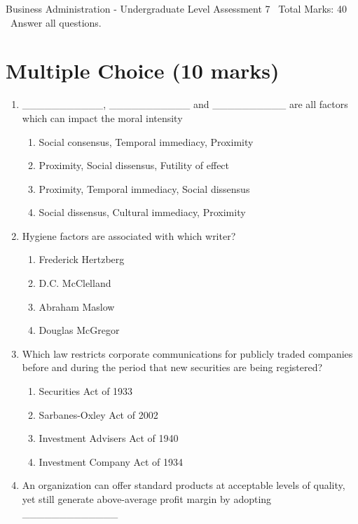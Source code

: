 \documentclass[12pt]{article}
\begin{document}
\begin{center}
Business Administration - Undergraduate Level Assessment 7 \
Total Marks: 40 \
Answer all questions.
\end{center}

\section*{Multiple Choice (10 marks)}
\begin{enumerate}[label=\arabic*.]
\item \_\_\_\_\_\_\_\_\_\_\_, \_\_\_\_\_\_\_\_\_\_\_ and \_\_\_\_\_\_\_\_\_\_ are all factors which can impact the moral intensity
\begin{enumerate}[label=(\alph*)]
    \item Social consensus, Temporal immediacy, Proximity
    \item Proximity, Social dissensus, Futility of effect
    \item Proximity, Temporal immediacy, Social dissensus
    \item Social dissensus, Cultural immediacy, Proximity
\end{enumerate}
\item Hygiene factors are associated with which writer?
\begin{enumerate}[label=(\alph*)]
    \item Frederick Hertzberg
    \item D.C. McClelland
    \item Abraham Maslow
    \item Douglas McGregor
\end{enumerate}
\item Which law restricts corporate communications for publicly traded companies before and during the period that new securities are being registered?
\begin{enumerate}[label=(\alph*)]
    \item Securities Act of 1933
    \item Sarbanes-Oxley Act of 2002
    \item Investment Advisers Act of 1940
    \item Investment Company Act of 1934
\end{enumerate}
\item An organization can offer standard products at acceptable levels of quality, yet still generate above-average profit margin by adopting \_\_\_\_\_\_\_\_\_\_\_\_\_
\begin{enumerate}[label=(\alph*)]

\end{enumerate}
\end{enumerate}
\end{document}
